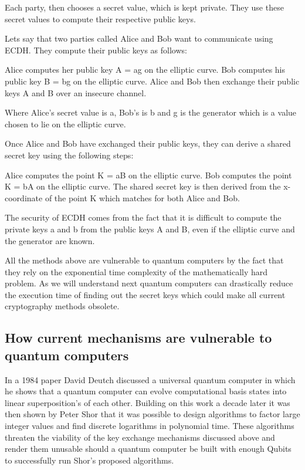 \documentclass{article}
\begin{document}
Each party, then chooses a secret value, which is kept private. They use these secret values to compute their respective public keys.

Lets say that two parties called Alice and Bob want to communicate using ECDH. They compute their public keys as follows:

Alice computes her public key A = ag on the elliptic curve.
Bob computes his public key B = bg on the elliptic curve.
Alice and Bob then exchange their public keys A and B over an insecure channel.

Where Alice's secret value is a, Bob's is b and g is the generator which is a value chosen to lie on the elliptic curve.

Once Alice and Bob have exchanged their public keys, they can derive a shared secret key using the following steps:

Alice computes the point K = aB on the elliptic curve.
Bob computes the point K = bA on the elliptic curve.
The shared secret key is then derived from the x-coordinate of the point K which matches for both Alice and Bob.

The security of ECDH comes from the fact that it is difficult to compute the private keys a and b from the public keys A and B, even if the elliptic curve and the generator are known.

All the methods above are vulnerable to quantum computers by the fact that they rely on the exponential time complexity of the mathematically hard problem. As we will understand next quantum computers can drastically reduce the execution time of finding out the secret keys which could make all current cryptography methods obsolete.

\subsection{How current mechanisms are vulnerable to quantum computers}
In a 1984 paper David Deutch \cite{Deutsch1985QuantumComputer} discussed a universal quantum computer in which he shows that a quantum computer can evolve computational basis states into linear superposition's of each other. Building on this work a decade later it was then shown by Peter Shor \cite{Shor1994AlgorithmsFactoring} that it was possible to design algorithms to factor large integer values and find discrete logarithms in polynomial time. These algorithms threaten the viability of the key exchange mechanisms discussed above and render them unusable should a quantum computer be built with enough Qubits to successfully run Shor's proposed algorithms.
\end{document}
